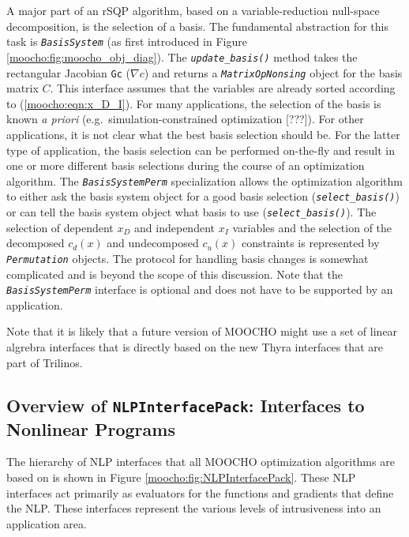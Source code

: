 \documentclass[pdf,ps2pdf,11pt]{SANDreport}
\begin{document}
\label{moocho:page:BasisSystem}

A major part of an rSQP algorithm, based on a variable-reduction null-space
decomposition, is the selection of a basis.  The fundamental abstraction for
this task is {}\texttt{\textit{BasisS\-ystem}} (as first introduced in Figure
{}\ref{moocho:fig:moocho_obj_diag}).  The {}\texttt{\textit{update\_basis()}}
method takes the rectangular Jacobian {}\texttt{Gc} ($\nabla c$) and returns a
{}\texttt{\textit{Matrix\-Op\-Nonsing}} object for the basis matrix $C$.  This
interface assumes that the variables are already sorted according to
(\ref{moocho:eqn:x_D_I}).  For many applications, the selection of the basis is
known {\em a priori} (e.g.\ simulation-constrained optimization [???]).  For
other applications, it is not clear what the best basis selection should be.
For the latter type of application, the basis selection can be performed
on-the-fly and result in one or more different basis selections during the
course of an optimization algorithm.  The
{}\texttt{\textit{Basis\-System\-Perm}} specialization allows the optimization
algorithm to either ask the basis system object for a good basis selection
(\texttt{\textit{select\_basis()}}) or can tell the basis system object what
basis to use (\texttt{\textit{select\_basis()}}).  The selection of dependent
$x_D$ and independent $x_I$ variables and the selection of the decomposed
$c_d(x)$ and undecomposed $c_u(x)$ constraints is represented by
{}\texttt{\textit{Permutation}} objects.  The protocol for handling basis
changes is somewhat complicated and is beyond the scope of this discussion.
Note that the {}\texttt{\textit{Basis\-System\-Perm}} interface is optional
and does not have to be supported by an application.

Note that it is likely that a future version of MOOCHO might use a set of
linear algrebra interfaces that is directly based on the new Thyra interfaces
that are part of Trilinos.

%
\subsection{Overview of {}\texttt{NLPInterfacePack}: Interfaces to Nonlinear Programs}
\label{moocho:sec:nlpinterfacepack_overview}
%

The hierarchy of NLP interfaces that all MOOCHO optimization
algorithms are based on is shown in Figure
{}\ref{moocho:fig:NLPInterfacePack}.  These NLP interfaces act primarily
as evaluators for the functions and gradients that define the NLP.
These interfaces represent the various levels of intrusiveness into an
application area.
\end{document}
